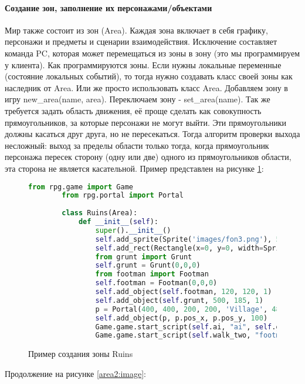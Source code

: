 \paragraph{Создание зон, заполнение их персонажами/объектами}
Мир также состоит из зон (Area). Каждая зона включает в себя графику, персонажи и предметы и сценарии взаимодействия. Исключение составляет команда PC, которая может перемещаться из зоны в зону (это мы программируем у клиента). Как программируются зоны. Если нужны локальные переменные (состояние локальных событий), то тогда нужно создавать класс своей зоны как наследник от Area. Или же просто использовать класс Area. Добавляем зону в игру new\_area(name, area). Переключаем зону - set\_area(name). Так же требуется задать область движения, её проще сделать как совокупность прямоугольников, за которые персонажи не могут выйти. Эти прямоугольники должны касаться друг друга, но не пересекаться. Тогда алгоритм проверки выхода несложный: выход за пределы области только тогда, когда прямоугольник персонажа пересек сторону (одну или две) одного из прямоугольников области, эта сторона не является касательной.
Пример представлен на рисунке \ref{area:image}:
\begin{figure}[H]
	\begin{lstlisting}[language=Python]
		from rpg.game import Game
		from rpg.portal import Portal
		
		class Ruins(Area):
			def __init__(self):
				super().__init__()
				self.add_sprite(Sprite('images/fon3.png'), 590, 400, 0)
				self.add_rect(Rectangle(x=0, y=0, width=Sprite('images/fon3.png').image.width(), height=Sprite('images/fon3.png').image.height()))
				from grunt import Grunt
				self.grunt = Grunt(0,0,0)
				from footman import Footman
				self.footman = Footman(0,0,0)
				self.add_object(self.footman, 120, 120, 1)
				self.add_object(self.grunt, 500, 185, 1)
				p = Portal(400, 400, 200, 200, 'Village', 480, 100)
				self.add_object(p, p.pos_x, p.pos_y, 100)
				Game.game.start_script(self.ai, "ai", self.grunt)
				Game.game.start_script(self.walk_two, "footman", 50, 50)		
	\end{lstlisting}  
\caption{Пример создания зоны Ruins}
\label{area:image}
\end{figure}
Продолжение на рисунке \ref{area2:image}:
